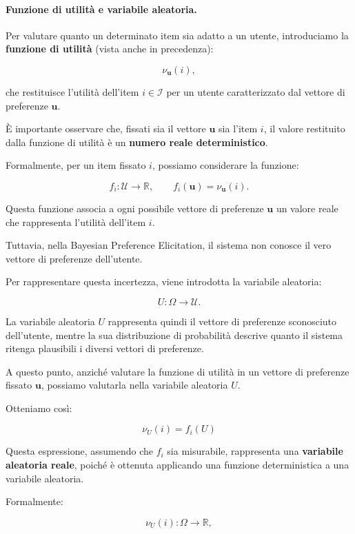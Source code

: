 \paragraph{Funzione di utilità e variabile aleatoria.}

Per valutare quanto un determinato item sia adatto a un utente,
introduciamo la \textbf{funzione di utilità} (vista anche in precedenza):

\[
\nu_{\mathbf u}(i),
\]

che restituisce l'utilità dell'item $i\in\mathcal I$ per un utente
caratterizzato dal vettore di preferenze $\mathbf u$.

È importante osservare che, fissati sia il vettore $\mathbf u$ sia
l'item $i$, il valore restituito dalla funzione di utilità è un
\textbf{numero reale deterministico}.

Formalmente, per un item fissato $i$, possiamo considerare la funzione:

\[
f_i:\mathcal U\longrightarrow\mathbb R,
\qquad
f_i(\mathbf u)=\nu_{\mathbf u}(i).
\]

Questa funzione associa a ogni possibile vettore di preferenze
$\mathbf u$ un valore reale che rappresenta l'utilità dell'item $i$.

Tuttavia, nella Bayesian Preference Elicitation, il sistema non conosce
il vero vettore di preferenze dell'utente.

Per rappresentare questa incertezza, viene introdotta la variabile
aleatoria:

\[
U:\Omega\longrightarrow\mathcal U.
\]

La variabile aleatoria $U$ rappresenta quindi il vettore di preferenze
sconosciuto dell'utente, mentre la sua distribuzione di probabilità
descrive quanto il sistema ritenga plausibili i diversi vettori
di preferenze.

A questo punto, anziché valutare la funzione di utilità in un vettore
di preferenze fissato $\mathbf u$, possiamo valutarla nella variabile
aleatoria $U$.

Otteniamo così:

\[
\boxed{
\nu_U(i)=f_i(U)
}
\]

Questa espressione, assumendo che $f_i$ sia misurabile, rappresenta
una \textbf{variabile aleatoria reale}, poiché è ottenuta applicando
una funzione deterministica a una variabile aleatoria.

Formalmente:

\[
\nu_U(i):\Omega\longrightarrow\mathbb R,
\]

